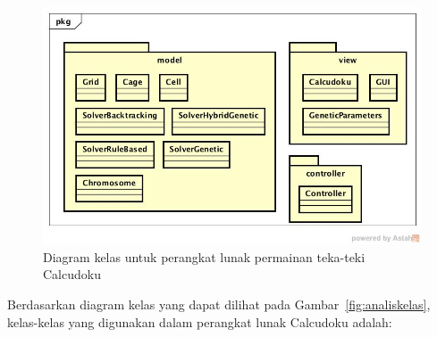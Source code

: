 \begin{figure}
\centering
\captionsetup{justification=centering}
\includegraphics[scale=0.5]{Gambar/Analisis/DiagramKelas.jpg}
\caption[Diagram kelas untuk perangkat lunak permainan teka-teki Calcudoku]{Diagram kelas untuk perangkat lunak permainan teka-teki Calcudoku}
\label{fig:analisiskelas}
\end{figure}

Berdasarkan diagram kelas yang dapat dilihat pada Gambar~\ref{fig:analiskelas}, kelas-kelas yang digunakan dalam perangkat lunak Calcudoku adalah:

